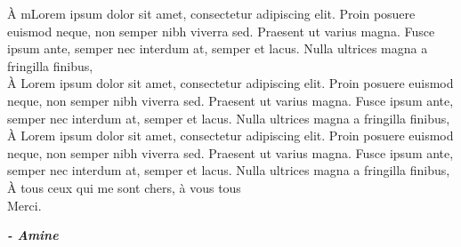 
\begin{fquote}
\begin{center}
\large{

\uppercase{à} mLorem ipsum dolor sit amet, consectetur adipiscing elit. Proin posuere euismod neque, non semper nibh viverra sed. Praesent ut varius magna. Fusce ipsum ante, semper nec interdum at, semper et lacus. Nulla ultrices magna a fringilla finibus,\\[12pt]
\uppercase{à} Lorem ipsum dolor sit amet, consectetur adipiscing elit. Proin posuere euismod neque, non semper nibh viverra sed. Praesent ut varius magna. Fusce ipsum ante, semper nec interdum at, semper et lacus. Nulla ultrices magna a fringilla finibus,\\[12pt]
\uppercase{à} Lorem ipsum dolor sit amet, consectetur adipiscing elit. Proin posuere euismod neque, non semper nibh viverra sed. Praesent ut varius magna. Fusce ipsum ante, semper nec interdum at, semper et lacus. Nulla ultrices magna a fringilla finibus,\\[12pt]
\uppercase{à} tous ceux qui me sont chers, à vous tous\\[12pt]
Merci.
}
\end{center}
\bigskip
\medskip
\end{fquote}

\begin{adjustwidth}{2cm}{1cm}
\hspace*{\fill} \textbf{\textit{\large{- Amine}}}
\end{adjustwidth}

\clearpage